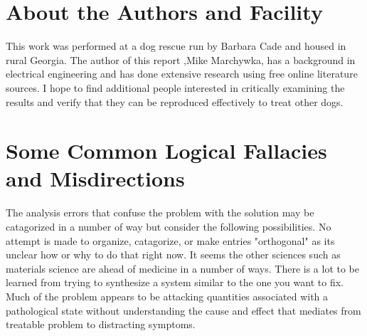 \begin{mdpicomment}
\section{About the Authors and Facility}
This work was performed at a dog rescue run by Barbara Cade and
housed in rural Georgia.  The author of this report 
,Mike Marchywka,
has a background in electrical engineering and 
has done extensive research using free online literature sources.  
I hope to find additional people interested in critically 
examining the results and verify that they can be reproduced
effectively to treat other dogs.

\begin{comment}
\begin{figure}[htb] 
\centering
\mjmed{ picture commented out to save space in drafts...  } 
\caption{ 
 }
\end{figure}

\end{comment}



\section{Some Common Logical Fallacies and Misdirections}
\label{appendix:errors}

The analysis errors that confuse the problem with the
solution may be catagorized in a number of way but
consider the following possibilities. No attempt is made
to organize, catagorize, or make entries "orthogonal"
as its unclear how or why to do that right now.  
It seems the other sciences such as materials science are
ahead of medicine in a number of ways. There is a lot to
be learned from trying to synthesize a system similar to the
one you want to fix. Much of the problem appears to be attacking
quantities associated with a pathological state without understanding
the cause and effect that mediates from treatable problem to
distracting symptoms. 



\end{mdpicomment}
